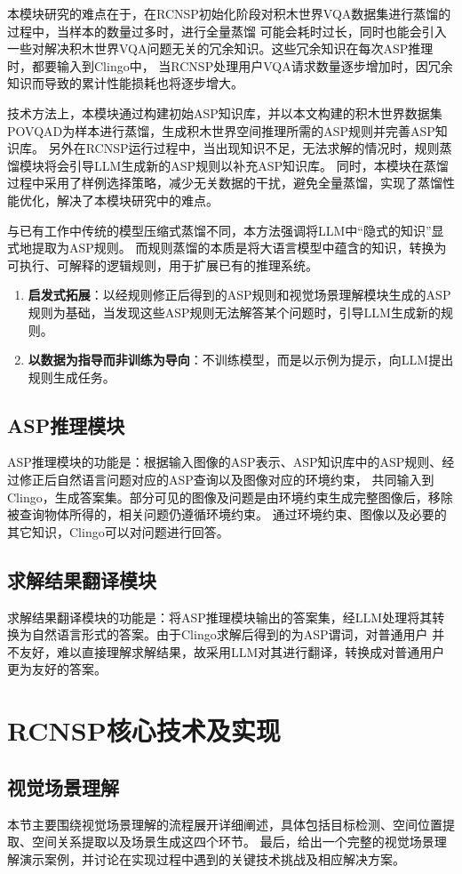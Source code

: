 本模块研究的难点在于，在RCNSP初始化阶段对积木世界VQA数据集进行蒸馏的过程中，当样本的数量过多时，进行全量蒸馏
可能会耗时过长，同时也能会引入一些对解决积木世界VQA问题无关的冗余知识。这些冗余知识在每次ASP推理时，都要输入到Clingo中，
当RCNSP处理用户VQA请求数量逐步增加时，因冗余知识而导致的累计性能损耗也将逐步增大。

技术方法上，本模块通过构建初始ASP知识库，并以本文构建的积木世界数据集POVQA\-D为样本进行蒸馏，生成积木世界空间推理所需的ASP规则并完善ASP知识库。
另外在RCNSP运行过程中，当出现知识不足，无法求解的情况时，规则蒸馏模块将会引导LLM生成新的ASP规则以补充ASP知识库。
同时，本模块在蒸馏过程中采用了样例选择策略，减少无关数据的干扰，避免全量蒸馏，实现了蒸馏性能优化，解决了本模块研究中的难点。

与已有工作中传统的模型压缩式蒸馏不同，本方法强调将LLM中“隐式的知识”显式地提取为ASP规则。
而规则蒸馏的本质是将大语言模型中蕴含的知识，转换为可执行、可解释的逻辑规则，用于扩展已有的推理系统。
\begin{enumerate}[nosep]
\item \textbf{启发式拓展}：以经规则修正后得到的ASP规则和视觉场景理解模块生成的ASP规则为基础，当发现这些ASP规则无法解答某个问题时，引导LLM生成新的规则。
\item \textbf{以数据为指导而非训练为导向}：不训练模型，而是以示例为提示，向LLM提出规则生成任务。
\end{enumerate}
\subsection{ASP推理模块}
ASP推理模块的功能是：根据输入图像的ASP表示、ASP知识库中的ASP规则、经过修正后自然语言问题对应的ASP查询以及图像对应的环境约束，
共同输入到Clingo，生成答案集。部分可见的图像及问题是由环境约束生成完整图像后，移除被查询物体所得的，相关问题仍遵循环境约束。
通过环境约束、图像以及必要的其它知识，Clingo可以对问题进行回答。
\subsection{求解结果翻译模块}
求解结果翻译模块的功能是：将ASP推理模块输出的答案集，经LLM处理将其转换为自然语言形式的答案。由于Clingo求解后得到的为ASP谓词，对普通用户
并不友好，难以直接理解求解结果，故采用LLM对其进行翻译，转换成对普通用户更为友好的答案。
\section{RCNSP核心技术及实现}
\subsection{视觉场景理解}
本节主要围绕视觉场景理解的流程展开详细阐述，具体包括目标检测、空间位置提取、空间关系提取以及场景生成这四个环节。
最后，给出一个完整的视觉场景理解演示案例，并讨论在实现过程中遇到的关键技术挑战及相应解决方案。
